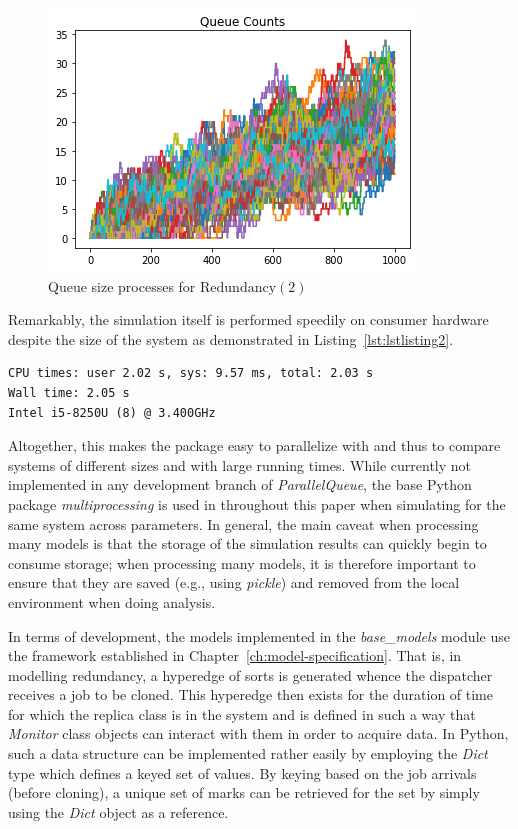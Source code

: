 \begin{figure}
    \centering
    \includegraphics[scale=0.8]{redundancy}
    \caption{Queue size processes for $\text{Redundancy}(2)$}
    \label{fig:redpic}

    \medskip
\end{figure}

Remarkably, the simulation itself is performed speedily on consumer hardware despite the size of the system as demonstrated in Listing~\ref{lst:lstlisting2}.
\begin{lstlisting}[label={lst:lstlisting2},style=mystyle, caption={Runtime statistics using the master \textit{ParallelQueue} branch}]
CPU times: user 2.02 s, sys: 9.57 ms, total: 2.03 s
Wall time: 2.05 s
Intel i5-8250U (8) @ 3.400GHz
\end{lstlisting}


Altogether, this makes the package easy to parallelize with and thus to compare systems of different sizes
and with large running times.
While currently not implemented in any development branch of \textit{ParallelQueue}, the base Python package
\textit{multiprocessing} is used in throughout this paper when simulating for the same system across parameters.
In general, the main caveat when processing many models is that the storage of the simulation results can quickly begin
to consume storage;
when processing many models, it is therefore important to ensure that they are saved (e.g., using \textit{pickle}) and removed from
the local environment when doing analysis.

In terms of development, the models implemented in the \textit{base\_models} module use the framework established in Chapter~\ref{ch:model-specification}.
That is, in modelling redundancy, a hyperedge of sorts is generated whence the dispatcher
receives a job to be cloned.
This hyperedge then exists for the duration of time for which the replica class is in the system and is defined in such
a way that \textit{Monitor} class objects can interact with them in order to acquire data.
In Python, such a data structure can be implemented rather easily by employing the \textit{Dict} type which defines
a keyed set of values.
By keying based on the job arrivals (before cloning), a unique set of marks can be retrieved for the set by simply using
the \textit{Dict} object as a reference.

